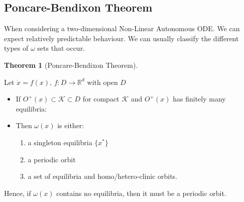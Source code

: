 \documentclass{article}
\newtheorem{thm}{Theorem}[section]
\begin{document}
\subsection{Poncare-Bendixon Theorem}
When considering a two-dimensional Non-Linear Autonomous ODE. We can expect relatively predictable behaviour. We can usually classify the different types of $\omega$ sets that occur.

\begin{thm}[Poncare-Bendixon Theorem]
\end{thm}
Let $\dot x = f(x)$, $f:D \to \mathbb{R}^d$ with open $D$
\begin{itemize}
    \item If $O^+(x) \subset \mathcal{K} \subset D$ for compact $\mathcal{K}$ and $O^+(x)$ has finitely many equilibria:
    \item Then $\omega(x)$ is either: \begin{enumerate}
        \item a singleton equilibria $\{x^*\}$
        \item a periodic orbit
        \item a set of equilibria and homo/hetero-clinic orbits.
    \end{enumerate}
\end{itemize}
Hence, if $\omega(x)$ contains no equilibria, then it must be a periodic orbit.
\end{document}

